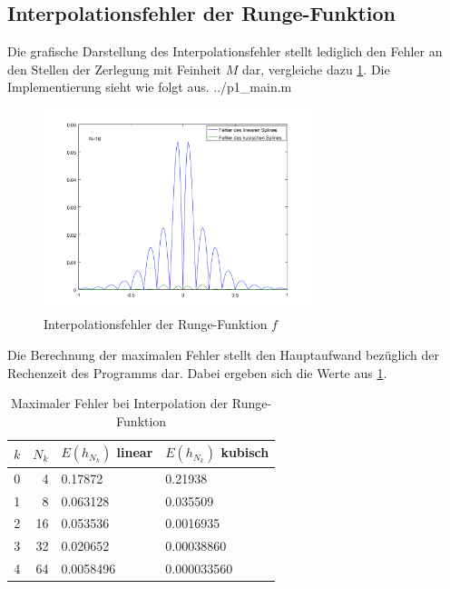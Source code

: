 \documentclass[a4paper, 11pt, ngerman]{scrartcl}
\begin{document}
\subsection{Interpolationsfehler der Runge-Funktion}
\label{sec: intfehlerrunge}
Die grafische Darstellung des Interpolationsfehler stellt lediglich den Fehler an den Stellen der Zerlegung mit Feinheit $M$ dar, vergleiche dazu \cref{fig: ffehlerplot}. Die Implementierung sieht wie folgt aus.
%
%
{../p1_main.m}

\begin{figure}[htbp] 
	\centering
	\includegraphics[width=0.7\textwidth]{../ffehlerplot.png}
	\caption{Interpolationsfehler der Runge-Funktion $f$}
	\label{fig: ffehlerplot}
\end{figure}

Die Berechnung der maximalen Fehler stellt den Hauptaufwand bezüglich der Rechenzeit des Programms dar. Dabei ergeben sich die Werte aus \cref{tab: ffehlermax}.

\begin{table}[h]
	\centering
	\begin{tabular}{cr|l|l}
		\hline
		$k$ & $N_k$ & $E(h_{N_k})$ linear & $E(h_{N_k})$ kubisch \\
		\hline
		0 & 4 & 0.17872 & 0.21938 \\
		\hline
		1 & 8 & 0.063128 & 0.035509 \\
		\hline 
		2 & 16 & 0.053536  & 0.0016935\\
		\hline 
		3 & 32 & 0.020652  & 0.00038860\\
		\hline 
		4 & 64 & 0.0058496 & 0.000033560\\
		\hline
	\end{tabular}
	\caption{Maximaler Fehler bei Interpolation der Runge-Funktion}
	\label{tab: ffehlermax}
\end{table}
\end{document}
